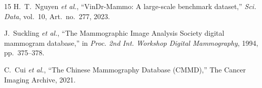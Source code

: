 \documentclass[runningheads]{llncs}
\begin{document}
\begin{thebibliography}{15}
H.~T.~Nguyen \textit{et al.}, ``VinDr-Mammo: A large-scale benchmark
dataset,'' \textit{Sci. Data}, vol.~10, Art.~no.~277, 2023.

J.~Suckling \textit{et al.}, ``The Mammographic Image Analysis Society
digital mammogram database,'' in \textit{Proc. 2nd Int. Workshop Digital
Mammography}, 1994, pp.~375--378.

C.~Cui \textit{et al.}, ``The Chinese Mammography Database (CMMD),''
The Cancer Imaging Archive, 2021.

\end{thebibliography}
\end{document}
